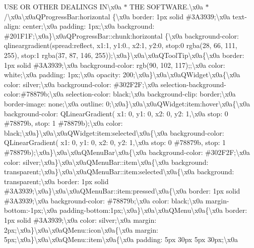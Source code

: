 U\+S\+E O\+R O\+T\+H\+E\+R D\+E\+A\+L\+I\+N\+G\+S I\+N\textbackslash{}x0a $\ast$ T\+H\+E S\+O\+F\+T\+W\+A\+R\+E.\textbackslash{}x0a $\ast$/\textbackslash{}x0a\textbackslash{}x0a\+Q\+Progress\+Bar\+:horizontal \{\textbackslash{}x0a border\+: 1px solid \#3\+A3939;\textbackslash{}x0a text-\/align\+: center;\textbackslash{}x0a padding\+: 1px;\textbackslash{}x0a background\+: \#201\+F1\+F;\textbackslash{}x0a\}\textbackslash{}x0a\+Q\+Progress\+Bar\+::chunk\+:horizontal \{\textbackslash{}x0a background-\/color\+: qlineargradient(spread\+:reflect, x1\+:1, y1\+:0., x2\+:1, y2\+:0, stop\+:0 rgba(28, 66, 111, 255), stop\+:1 rgba(37, 87, 146, 255));\textbackslash{}x0a\}\textbackslash{}x0a\textbackslash{}x0a\+Q\+Tool\+Tip\textbackslash{}x0a\{\textbackslash{}x0a border\+: 1px solid \#3\+A3939;\textbackslash{}x0a background-\/color\+: rgb(90, 102, 117);;\textbackslash{}x0a color\+: white;\textbackslash{}x0a padding\+: 1px;\textbackslash{}x0a opacity\+: 200;\textbackslash{}x0a\}\textbackslash{}x0a\textbackslash{}x0a\+Q\+Widget\textbackslash{}x0a\{\textbackslash{}x0a color\+: silver;\textbackslash{}x0a background-\/color\+: \#302\+F2\+F;\textbackslash{}x0a selection-\/background-\/color\+:\#78879b;\textbackslash{}x0a selection-\/color\+: black;\textbackslash{}x0a background-\/clip\+: border;\textbackslash{}x0a border-\/image\+: none;\textbackslash{}x0a outline\+: 0;\textbackslash{}x0a\}\textbackslash{}x0a\textbackslash{}x0a\+Q\+Widget\+:item\+:hover\textbackslash{}x0a\{\textbackslash{}x0a background-\/color\+: Q\+Linear\+Gradient( x1\+: 0, y1\+: 0, x2\+: 0, y2\+: 1,\textbackslash{}x0a stop\+: 0 \#78879b, stop\+: 1 \#78879b);\textbackslash{}x0a color\+: black;\textbackslash{}x0a\}\textbackslash{}x0a\textbackslash{}x0a\+Q\+Widget\+:item\+:selected\textbackslash{}x0a\{\textbackslash{}x0a background-\/color\+: Q\+Linear\+Gradient( x1\+: 0, y1\+: 0, x2\+: 0, y2\+: 1,\textbackslash{}x0a stop\+: 0 \#78879b, stop\+: 1 \#78879b);\textbackslash{}x0a\}\textbackslash{}x0a\textbackslash{}x0a\+Q\+Menu\+Bar\textbackslash{}x0a\{\textbackslash{}x0a background-\/color\+: \#302\+F2\+F;\textbackslash{}x0a color\+: silver;\textbackslash{}x0a\}\textbackslash{}x0a\textbackslash{}x0a\+Q\+Menu\+Bar\+::item\textbackslash{}x0a\{\textbackslash{}x0a background\+: transparent;\textbackslash{}x0a\}\textbackslash{}x0a\textbackslash{}x0a\+Q\+Menu\+Bar\+::item\+:selected\textbackslash{}x0a\{\textbackslash{}x0a background\+: transparent;\textbackslash{}x0a border\+: 1px solid \#3\+A3939;\textbackslash{}x0a\}\textbackslash{}x0a\textbackslash{}x0a\+Q\+Menu\+Bar\+::item\+:pressed\textbackslash{}x0a\{\textbackslash{}x0a border\+: 1px solid \#3\+A3939;\textbackslash{}x0a background-\/color\+: \#78879b;\textbackslash{}x0a color\+: black;\textbackslash{}x0a margin-\/bottom\+:-\/1px;\textbackslash{}x0a padding-\/bottom\+:1px;\textbackslash{}x0a\}\textbackslash{}x0a\textbackslash{}x0a\+Q\+Menu\textbackslash{}x0a\{\textbackslash{}x0a border\+: 1px solid \#3\+A3939;\textbackslash{}x0a color\+: silver;\textbackslash{}x0a margin\+: 2px;\textbackslash{}x0a\}\textbackslash{}x0a\textbackslash{}x0a\+Q\+Menu\+::icon\textbackslash{}x0a\{\textbackslash{}x0a margin\+: 5px;\textbackslash{}x0a\}\textbackslash{}x0a\textbackslash{}x0a\+Q\+Menu\+::item\textbackslash{}x0a\{\textbackslash{}x0a padding\+: 5px 30px 5px 30px;\textbackslash{}x0a 